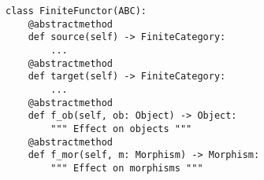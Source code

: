 \begin{verbatim}
class FiniteFunctor(ABC):
    @abstractmethod
    def source(self) -> FiniteCategory:
        ...
    @abstractmethod
    def target(self) -> FiniteCategory:
        ...
    @abstractmethod
    def f_ob(self, ob: Object) -> Object:
        """ Effect on objects """
    @abstractmethod
    def f_mor(self, m: Morphism) -> Morphism:
        """ Effect on morphisms """
\end{verbatim}